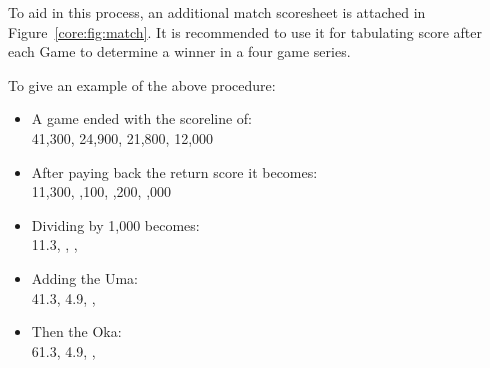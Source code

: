 To aid in this process, an additional match scoresheet is attached in Figure~\ref{core:fig:match}. It is recommended to use it for tabulating score after each Game to determine a winner in a four game series.

To give an example of the above procedure:
\begin{itemize}
	\item A game ended with the scoreline of: \\ 41,300, 24,900, 21,800, 12,000
	\item After paying back the return score it becomes: \\ 11,300, ,100, ,200, ,000
	\item Dividing by 1,000 becomes: \\ 11.3, , , 
	\item Adding the Uma: \\ 41.3, 4.9, , 
	\item Then the Oka: \\ 61.3, 4.9, , 
\end{itemize}


